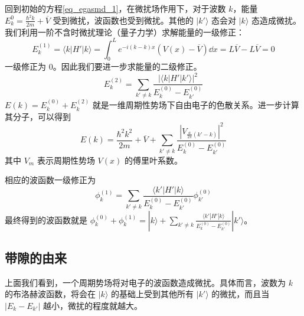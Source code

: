 回到初始的方程\autoref{eq_egasmd_1}，在微扰场作用下，对于波数 $k$，能量 $E_k^{0}=\frac{\hbar^2 k}{2m}+\overline V$ 受到微扰，波函数也受到微扰。其他的 $|k'\rangle$ 态会对 $|k\rangle$ 态造成微扰。我们利用一阶不含时微扰理论（量子力学）求解能量的一级修正：
\begin{equation}
E_k^{(1)}=\langle k|H'|k\rangle=\int_0^L e^{-i(k-k)x}(V(x)-\overline V)\dd x=L\overline V-L\overline V=0
\end{equation}
一级修正为 $0$。因此我们要进一步求能量的二级修正。
\begin{equation}
E_k^{(2)}=\sum_{k'\neq k}\frac{|\langle k|H'|k'\rangle|^2}{E_k^{(0)}-E_{k'}^{(0)}}
\end{equation}
$E(k)=E_k^{(0)}+E_k^{(2)}$ 就是一维周期性势场下自由电子的色散关系。进一步计算其分子，可以得到
\begin{equation}
E(k)=\frac{\hbar^2 k^2}{2m}+\overline V+\sum_{k'\neq k} \frac{|V_{\frac{a}{2\pi}(k'-k)}|^2}{E_k^{(0)}-E_{k'}^{(0)}}
\end{equation}
其中 $V_m$ 表示周期性势场 $V(x)$ 的傅里叶系数。

相应的波函数一级修正为
\begin{equation}
\phi_k^{(1)}=\sum_{k'\neq k}\frac{\langle k'|H'|k\rangle}{E_k^{(0)}-E_{k'}^{(0)}} \phi_{k'}^{(0)}
\end{equation}
最终得到的波函数就是 $\phi_k^{(0)}+\phi_k^{(1)}=|k\rangle+\sum_{k'\neq k}\frac{\langle k'|H'|k\rangle}{E_k^{(0)}-E_{k'}^{(0)}} |k'\rangle$。
\subsection{带隙的由来}
上面我们看到，一个周期势场将对电子的波函数造成微扰。具体而言，波数为 $k$ 的布洛赫波函数，将会在 $|k\rangle$ 的基础上受到其他所有 $|k'\rangle$ 的微扰，而且当 $|E_k-E_{k'}|$ 越小，微扰的程度就越大。


